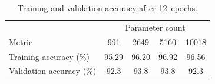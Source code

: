 \begin{table}[ht]
    \centering
    \caption{Training and validation  accuracy after 12~epochs.\label{tab:val-acc}}
    \begin{tabular}{|l|c|c|c|c|}
        \hline
        & \multicolumn{4}{c|}{Parameter count} \\ \cline{2-5}
        Metric & 991 & 2649 & 5160 & 10018 \\ \hline
        Training accuracy  (\%)   & 95.29 & 96.20 & 96.92 & 96.56 \\ \hline
        Validation accuracy (\%) & 92.3 & 93.8 & 93.8 & 92.3 \\ \hline
        
    \end{tabular}
\end{table}


